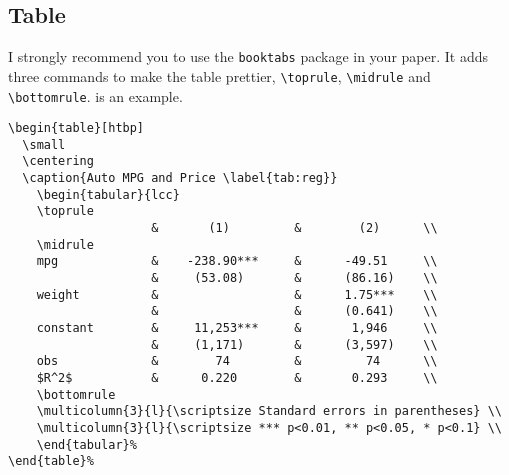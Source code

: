 \documentclass[11pt]{elegantpaper}
\begin{document}
\subsection{Table}
I strongly recommend you to use the \lstinline{booktabs} package in your paper. It adds three commands to make the table prettier,  \lstinline{\toprule}, \lstinline{\midrule} and \lstinline{\bottomrule}.  is an example.


\begin{lstlisting}
\begin{table}[htbp]
  \small
  \centering
  \caption{Auto MPG and Price \label{tab:reg}}
    \begin{tabular}{lcc}
    \toprule
                    &       (1)         &        (2)      \\
    \midrule
    mpg             &    -238.90***     &      -49.51     \\
                    &     (53.08)       &      (86.16)    \\
    weight          &                   &      1.75***    \\
                    &                   &      (0.641)    \\
    constant        &     11,253***     &       1,946     \\
                    &     (1,171)       &      (3,597)    \\
    obs             &        74         &         74      \\
    $R^2$           &      0.220        &       0.293     \\
    \bottomrule
    \multicolumn{3}{l}{\scriptsize Standard errors in parentheses} \\
    \multicolumn{3}{l}{\scriptsize *** p<0.01, ** p<0.05, * p<0.1} \\
    \end{tabular}%
\end{table}%
\end{lstlisting}
\end{document}
